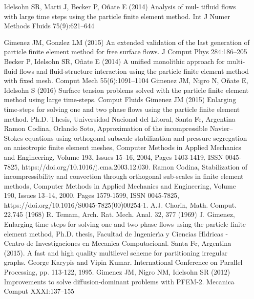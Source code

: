  Idelsohn SR, Marti J, Becker P, Oñate E (2014) Analysis of mul-
tifluid flows with large time steps using the particle finite element
method. Int J Numer Methods Fluids 75(9):621–644

 Gimenez JM, Gonzlez LM (2015) An extended validation of the
last generation of particle finite element method for free surface
flows. J Comput Phys 284:186–205
 Becker P, Idelsohn SR, Oñate E (2014) A unified monolithic
approach for multi-fluid flows and fluid-structure interaction using
the particle finite element method with fixed mesh. Comput Mech
55(6):1091–1104
 Gimenez JM, Nigro N, Oñate E, Idelsohn S (2016) Surface tension
problems solved with the particle finite element method using large
time-steps. Comput Fluids
 Gimenez JM (2015) Enlarging time-steps for solving one and two
phase flows using the particle finite element method. Ph.D. Thesis,
Universidad Nacional del Litoral, Santa Fe, Argentina
 Ramon Codina, Orlando Soto,
Approximation of the incompressible Navier–Stokes equations using orthogonal subscale stabilization and pressure segregation on anisotropic finite element meshes,
Computer Methods in Applied Mechanics and Engineering,
Volume 193, Issues 15–16,
2004,
Pages 1403-1419,
ISSN 0045-7825,
https://doi.org/10.1016/j.cma.2003.12.030.
 Ramon Codina,
Stabilization of incompressibility and convection through orthogonal sub-scales in finite element methods,
Computer Methods in Applied Mechanics and Engineering,
Volume 190, Issues 13–14,
2000,
Pages 1579-1599,
ISSN 0045-7825,
https://doi.org/10.1016/S0045-7825(00)00254-1.
A.J. Chorin, Math. Comput. 22,745 (1968)
R. Temam, Arch. Rat. Mech. Anal. 32, 377 (1969)
  J. Gimenez, Enlarging time steps for solving one and two phase flows using the particle finite element
 method, Ph.D. thesis, Facultad de Ingenier\'{\i}a y Ciencias H\'{\i}dricas - Centro de Investigaciones en Mecanica
 Computacional. Santa Fe, Argentina (2015).
 A fast and high quality multilevel scheme for partitioning irregular graphs.
George Karypis and Vipin Kumar. International Conference on Parallel Processing, pp. 113-122, 1995.
 Gimenez JM, Nigro NM, Idelsohn SR (2012) Improvements to solve diffusion-dominant problems with PFEM-2. Mecanica Comput XXXI:137–155
